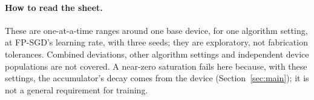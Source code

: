 \paragraph{How to read the sheet.} These are one-at-a-time ranges around one base device, for one algorithm setting, at FP-SGD's
learning rate, with three seeds; they are exploratory, not fabrication tolerances. Combined deviations, other algorithm
settings and independent device populations are not covered. A near-zero saturation fails here because, with these settings,
the accumulator's decay comes from the device (Section~\ref{sec:main}); it is not a general requirement for training.


